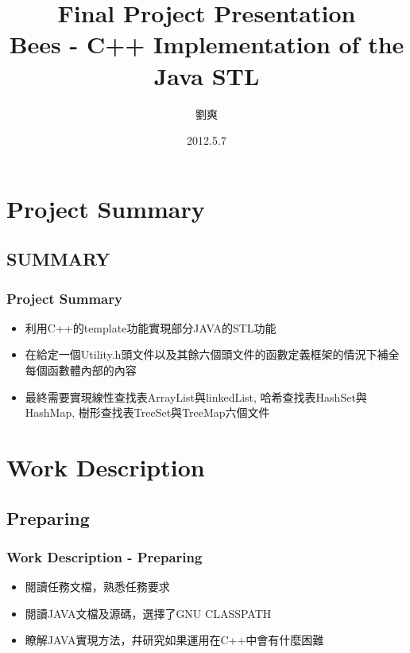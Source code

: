 \documentclass[table, usenames,dvipsnames,svgnames]{beamer}
\title[Final Project Presentation]{\Large{Final Project Presentation}\\\vspace{2mm}\normalsize{Bees - C++ Implementation of the Java STL}}
\author[LiuShuang]{劉爽}
\institute[SJTU ZJ 2011]{上海交通大學致遠學院2011級}
\date[2012.5.7]{2012.5.7}
\begin{document}
\begin{frame}
\titlepage
\end{frame}

\section{Project Summary}
\subsection{SUMMARY}

\begin{frame}

\frametitle{Project Summary}


\pause
\begin{itemize}
\item 利用C++的template功能實現部分JAVA的STL功能 \pause
\vspace{3mm}

\item 在給定一個Utility.h頭文件以及其餘六個頭文件的函數定義框架的情況下補全每個函數體內部的內容 \pause
\vspace{3mm}

\item 最終需要實現線性查找表ArrayList與linkedList, 哈希查找表HashSet與HashMap, 樹形查找表TreeSet與TreeMap六個文件
\end{itemize}

\end{frame}

\section{Work Description}
\subsection{Preparing}

\begin{frame}

\frametitle{Work Description - Preparing}


\pause
\begin{itemize}
\item 閱讀任務文檔，熟悉任務要求 \pause
\vspace{3mm}

\item 閱讀JAVA文檔及源碼，選擇了GNU CLASSPATH \pause
\vspace{3mm}

\item 瞭解JAVA實現方法，幷研究如果運用在C++中會有什麼困難
\end{itemize}
    
\end{frame}
\end{document}
